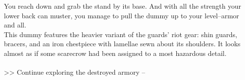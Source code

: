 You reach down and grab the stand by its base. And with all the strength your lower back can muster, you manage to pull the dummy up to your level--armor and all.\\

This dummy features the heavier variant of the guards’ riot gear: shin guards, bracers, and an iron chestpiece with lamellae sewn about its shoulders. It looks almost as if some scarecrow had been assigned to a most hazardous detail.\\
\\

>> Continue exploring the destroyed armory -- 